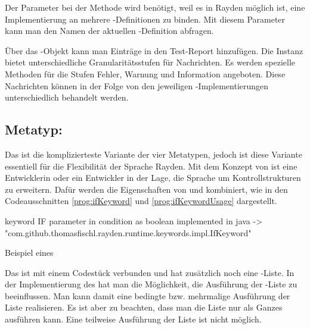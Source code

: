 \SuperPar
Der Parameter  bei der Methode  wird benötigt, weil es in Rayden möglich ist, eine Implementierung an mehrere -Definitionen zu binden. Mit diesem Parameter kann man den Namen der aktuellen -Definition abfragen.

\SuperPar
Über das -Objekt kann man Einträge in den Test-Report hinzufügen. Die Instanz bietet unterschiedliche Granularitätsstufen für Nachrichten. Es werden spezielle Methoden für die Stufen Fehler, Warnung und Information angeboten. Diese Nachrichten können in der Folge von den jeweiligen -Implementierungen unterschiedlich behandelt werden. 


\subsection{Metatyp: }

Das  ist die komplizierteste Variante der vier Metatypen, jedoch ist diese Variante essentiell für die Flexibilität der Sprache Rayden. Mit dem Konzept von  ist eine Entwicklerin oder ein Entwickler in der Lage, die Sprache um Kontrollstrukturen zu erweitern. Dafür werden die Eigenschaften von  und  kombiniert, wie in den Codeausschnitten \ref{prog:ifKeyword} und \ref{prog:ifKeywordUsage} dargestellt. 

\begin{program}
\begin{JavaCode}
keyword IF { 
	parameter in condition as boolean
	implemented in java -> "com.github.thomasfischl.rayden.runtime.keywords.impl.IfKeyword"
}
\end{JavaCode}
\caption{Beispiel eines }
\label{prog:ifKeyword}
\end{program}

\SuperPar
Das  ist mit einem Codestück verbunden und hat zusätzlich noch eine -Liste. In der Implementierung des  hat man die Möglichkeit, die Ausführung der -Liste zu beeinflussen. Man kann damit eine bedingte bzw. mehrmalige Ausführung der Liste realisieren. Es ist aber zu beachten, dass man die Liste nur als Ganzes ausführen kann. Eine teilweise Ausführung der Liste ist nicht möglich.

